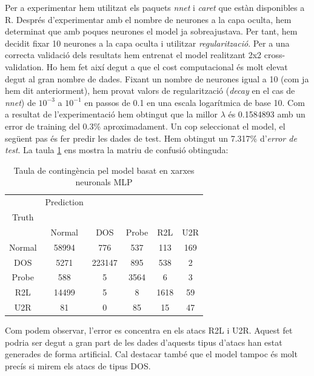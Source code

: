 \documentclass[a4paper]{article} %
\begin{document}
Per a experimentar hem utilitzat els paquets \textit{nnet} \cite{nnet} i \textit{caret} \cite{caret} que estàn disponibles a R.
Després d'experimentar amb el nombre de neurones a la capa oculta, hem determinat que amb poques neurones el model ja sobreajustava. Per tant, hem decidit fixar 10 neurones a la capa oculta i utilitzar \textit{regularització}.
Per a una correcta validació dels resultats hem entrenat el model realitzant 2x2 cross-validation. Ho hem fet així degut a que el cost computacional és molt elevat degut al gran nombre de dades. Fixant un nombre de neurones igual a 10 (com ja hem dit anteriorment), hem provat valors de regularització (\textit{decay} en el cas de \textit{nnet}) de $10^{-3}$ a $10^{-1}$ en passos de 0.1 en una escala logarítmica de base 10.
Com a resultat de l'experimentació hem obtingut que la millor $\lambda$ és 0.1584893 amb un error de training del 0.3\% aproximadament.
Un cop seleccionat el model, el següent pas és fer predir les dades de test. Hem obtingut un 7.317\% d'\textit{error de test}. La taula \ref{table:nnet_table} ens mostra la matriu de confusió obtinguda:


\begin{table}[H]
	\centering
	\begin{tabular}{c | c c c c c}
			& Prediction\\
		Truth\\
				& Normal & DOS & Probe & R2L & U2R \\
		\hline
		Normal	& 58994	& 776 & 537	 &  113	& 169 \\
		DOS		& 5271	&  223147 &  895	 &   538 & 2\\ 
		Probe	& 588	& 	5 & 3564	 & 6	&  3 \\
		R2L		& 14499	& 5	& 8   & 1618 & 59\\
		U2R		& 81	&	0 & 85    &  15 	& 47\\	
	\end{tabular}
	\caption{Taula de contingència pel model basat en xarxes neuronals MLP}
	\label{table:nnet_table}
\end{table}

Com podem observar, l'error es concentra en els atacs R2L i U2R. Aquest fet podria ser degut a gran part de les dades d'aquests tipus d'atacs han estat generades de forma artificial. Cal destacar també que el model tampoc és molt precís si mirem els atacs de tipus DOS.
\end{document}
